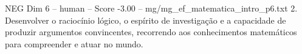\begin{textsample}{NEG Dim 6 – human – Score -3.00 – mg/mg\_ef\_matematica\_intro\_p6.txt}  \label{ex:f6_neg_008}
2.
Desenvolver o raciocínio lógico, o espírito de investigação e a capacidade de produzir argumentos convincentes, recorrendo aos conhecimentos matemáticos para compreender e atuar no mundo.

\end{textsample}
